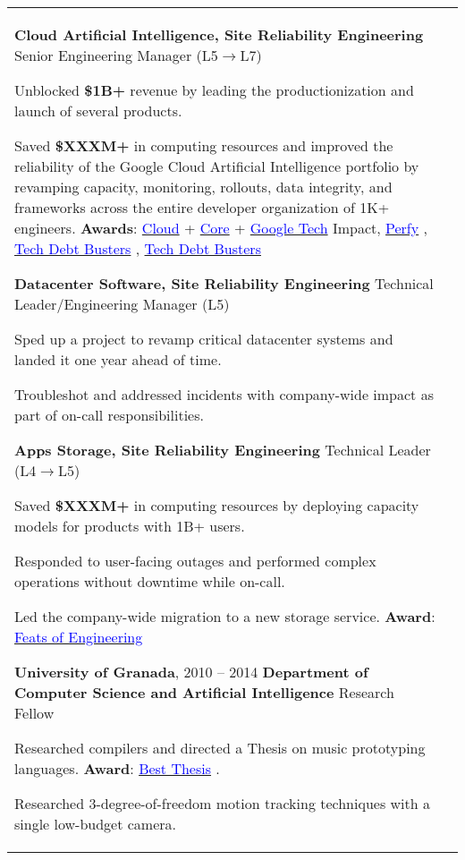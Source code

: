 \documentclass[letterpaper,10pt,oneside]{article}
\newcommand{\DatestampY}[1]{#1}
\newcommand{\itemspacing}{\vspace{0.10cm}}
\newcommand{\sref}[2]{%
    \href{https://0/local/attachments/#1}{\textcolor{blue}{#2}}%
}
\newenvironment{body}
{\par\par
\begin{longtable}{p{0.145\textwidth}p{0.81\textwidth}}}
{\par\end{longtable}\par}
\begin{document}
\begin{body}
\phantom{g}\textbf{Cloud Artificial Intelligence, Site Reliability Engineering} \textemdash{ }Senior Engineering Manager (L5$\rightarrow$L7)
\begin{comp}
\item Unblocked \textbf{\$1B+} revenue by leading the productionization and launch of several products.
\item Saved \textbf{\$XXXM+} in computing resources and improved the reliability of the Google Cloud Artificial Intelligence portfolio by revamping capacity, monitoring, rollouts, data integrity, and frameworks across the entire developer organization of 1K+ engineers. \textbf{Awards}: \sref{Google-Award-GoogleCloudTechImpact-2022.pdf}{Cloud} + \sref{Google-Award-CoreTechImpact-2021.pdf}{Core} + \sref{Google-Award-GoogleTechImpact-2022.pdf}{Google Tech} Impact, \sref{Google-Award-Perfy.pdf}{Perfy}, \sref{Google-Award-TechDebtBusters1.pdf}{Tech Debt Busters}, \sref{Google-Award-TechDebtBusters2.pdf}{Tech Debt Busters}
\end{comp}
\itemspacing

\phantom{g}\textbf{Datacenter Software, Site Reliability Engineering} \textemdash{ }Technical Leader/Engineering Manager (L5)
\begin{comp}
\item Sped up a project to revamp critical datacenter systems and landed it one year ahead of time.
\item Troubleshot and addressed incidents with company-wide impact as part of on-call responsibilities.
\end{comp}
\itemspacing

\phantom{g}\textbf{Apps Storage, Site Reliability Engineering} \textemdash{ }Technical Leader (L4$\rightarrow$L5)
\begin{comp}
\item Saved \textbf{\$XXXM+} in computing resources by deploying capacity models for products with 1B+ users.
\item Responded to user-facing outages and performed complex operations without downtime while on-call.
\item Led the company-wide migration to a new storage service. \textbf{Award}:\hspace{0.1cm}\sref{Google-Award-FeatsOfEngineering-2018.pdf}{Feats of Engineering}
\end{comp}
\itemspacing

\textbf{University of Granada}, \DatestampY{2010} -- \DatestampY{2014} \vspace{0.06cm} \newline
\phantom{g}\textbf{Department of Computer Science and Artificial Intelligence} \textemdash{ }Research Fellow
\begin{comp}
\item Researched compilers and directed a Thesis on music prototyping languages. \textbf{Award}: \sref{UGR-Award-BestMasterThesis-MusicPrototyping.pdf}{Best Thesis}.
\item Researched 3-degree-of-freedom motion tracking techniques with a single low-budget camera.
\end{comp}


\end{body}
\end{document}

